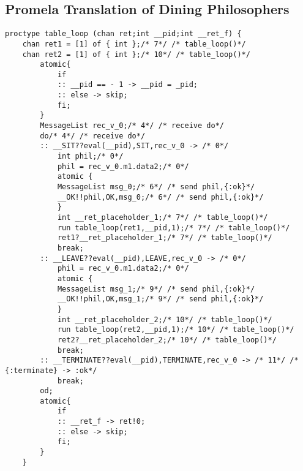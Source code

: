 \subsection{Promela Translation of Dining Philosophers}
\begin{lstlisting}[xleftmargin=.001\linewidth, xrightmargin=0.001\linewidth, caption={Dining Philosophers Promela translation.}, label={lst:promela_dp}]
  proctype table_loop (chan ret;int __pid;int __ret_f) {
    chan ret1 = [1] of { int };/* 7*/ /* table_loop()*/ 
    chan ret2 = [1] of { int };/* 10*/ /* table_loop()*/ 
        atomic{
            if
            :: __pid == - 1 -> __pid = _pid;
            :: else -> skip;
            fi;
        }
        MessageList rec_v_0;/* 4*/ /* receive do*/ 
        do/* 4*/ /* receive do*/ 
        :: __SIT??eval(__pid),SIT,rec_v_0 -> /* 0*/ 
            int phil;/* 0*/ 
            phil = rec_v_0.m1.data2;/* 0*/ 
            atomic {
            MessageList msg_0;/* 6*/ /* send phil,{:ok}*/ 
            __OK!!phil,OK,msg_0;/* 6*/ /* send phil,{:ok}*/ 
            }
            int __ret_placeholder_1;/* 7*/ /* table_loop()*/ 
            run table_loop(ret1,__pid,1);/* 7*/ /* table_loop()*/ 
            ret1?__ret_placeholder_1;/* 7*/ /* table_loop()*/ 
            break;
        :: __LEAVE??eval(__pid),LEAVE,rec_v_0 -> /* 0*/ 
            phil = rec_v_0.m1.data2;/* 0*/ 
            atomic {
            MessageList msg_1;/* 9*/ /* send phil,{:ok}*/ 
            __OK!!phil,OK,msg_1;/* 9*/ /* send phil,{:ok}*/ 
            }
            int __ret_placeholder_2;/* 10*/ /* table_loop()*/ 
            run table_loop(ret2,__pid,1);/* 10*/ /* table_loop()*/ 
            ret2?__ret_placeholder_2;/* 10*/ /* table_loop()*/ 
            break;
        :: __TERMINATE??eval(__pid),TERMINATE,rec_v_0 -> /* 11*/ /* {:terminate} -> :ok*/ 
            break;
        od;
        atomic{
            if
            :: __ret_f -> ret!0;
            :: else -> skip;
            fi;
        }
    }
    

\end{lstlisting}
